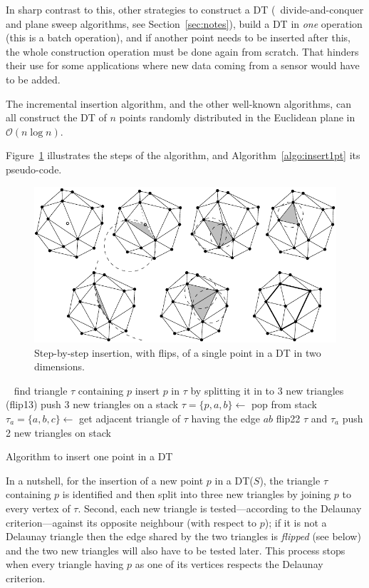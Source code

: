 %

In sharp contrast to this, other strategies to construct a DT (\eg\ divide-and-conquer and plane sweep algorithms, see Section~\ref{sec:notes}), build a DT in \emph{one} operation (this is a batch operation), and if another point needs to be inserted after this, the whole construction operation must be done again from scratch. 
That hinders their use for some applications where new data coming from a sensor would have to be added.

%

The incremental insertion algorithm, and the other well-known algorithms, can all construct the DT of $n$ points randomly distributed in the Euclidean plane in $\mathcal{O}(n \log n)$.

%

Figure~\ref{fig:insertion_steps} illustrates the steps of the algorithm, and Algorithm~\ref{algo:insert1pt} its pseudo-code. 
\begin{figure}
  \centering
  \includegraphics[width=\textwidth]{figs/insertion_steps}
  \caption{Step-by-step insertion, with flips, of a single point in a DT in two dimensions.}%
\label{fig:insertion_steps}
\end{figure}
\begin{algorithm}[tb] 
  \DontPrintSemicolon\
  find triangle $\tau$ containing $p$\;
  insert $p$ in $\tau$ by splitting it in to 3 new triangles (flip13)\;
  push 3 new triangles on a stack\;
  {
    $\tau = \{p,a,b\} \leftarrow$ pop from stack\;
    $\tau_{a} = \{a,b,c\} \leftarrow$ get adjacent triangle of $\tau$ having the edge $ab$\;
    \If{$c$ is inside circumcircle of $\tau$}
    {
      flip22 $\tau$ and $\tau_{a}$\;
      push 2 new triangles on stack\;
    }
  }
  \caption{Algorithm to insert one point in a DT}%
\label{algo:insert1pt}
\end{algorithm} 
In a nutshell, for the insertion of a new point $p$ in a DT($S$), the triangle $\tau$ containing $p$ is identified and then split into three new triangles by joining $p$ to every vertex of $\tau$. 
Second, each new triangle is tested---according to the Delaunay criterion---against its opposite neighbour (with respect to $p$); if it is not a Delaunay triangle then the edge shared by the two triangles is \emph{flipped} (see below) and the two new triangles will also have to be tested later. 
This process stops when every triangle having $p$ as one of its vertices respects the Delaunay criterion.


